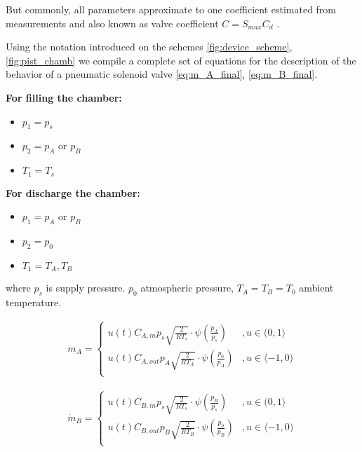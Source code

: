 But commonly, all parameters approximate to one coefficient
estimated from measurements and also known as valve coefficient
$C = S_{max} C_d$
\cite{fluid}.

Using the notation introduced on the schemes \ref{fig:device_scheme},
\ref{fig:pist_chamb} we compile a complete set of equations for the
description of the behavior of a
pneumatic solenoid valve \ref{eq:m_A_final}, \ref{eq:m_B_final}.

\textbf{For filling the chamber:}
\begin{itemize}
\item $p_1 = p_s$ 
\item $p_2 = p_A \text{ or } p_B$
\item $T_1 = T_s$
\end{itemize}

\textbf{For discharge the chamber:}
\begin{itemize}
\item $p_1 = p_A \text{ or } p_B$
\item $p_2 = p_0$
\item $T_1 = T_A, T_B$
\end{itemize}

where $p_s$ is supply pressure. $p_0$ atmospheric pressure, $T_A = T_B =
T_0$ ambient temperature.

\begin{align}
    \dot{m}_A =
    \begin{cases}
        u(t) C_{A,in} p_s \sqrt{\frac{2}{RT_s}}
        \cdot \psi\left(\frac{p_A}{p_s}\right)  &,   u \in (0, 1 \rangle \\
        u(t) C_{A,out} p_A \sqrt{\frac{2}{RT_A}}
        \cdot \psi\left(\frac{p_0}{p_A}\right)  &,   u \in \langle -1, 0) \\
    \end{cases}
    \label{eq:m_A_final}
\end{align}

\begin{align}
    \dot{m}_B =
    \begin{cases}
        u(t) C_{B,in} p_s \sqrt{\frac{2}{RT_s}}
        \cdot \psi\left(\frac{p_B}{p_s}\right)  &,   u \in (0, 1 \rangle \\
        u(t) C_{B,out} p_B \sqrt{\frac{2}{RT_B}}
        \cdot \psi\left(\frac{p_0}{p_B}\right)  &,   u \in \langle -1, 0) \\
    \end{cases}
    \label{eq:m_B_final}
\end{align}

